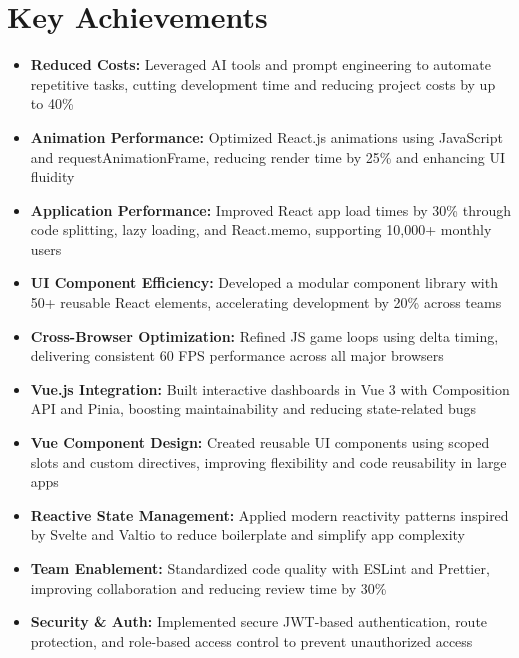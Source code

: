 \documentclass[11pt]{article}
\begin{document}
\section{Key Achievements}
\begin{itemize}
\item \textbf{Reduced Costs:} Leveraged AI tools and prompt engineering to automate repetitive tasks, cutting development time and reducing project costs by up to 40\%
\item \textbf{Animation Performance:} Optimized React.js animations using JavaScript and requestAnimationFrame, reducing render time by 25\% and enhancing UI fluidity
\item \textbf{Application Performance:} Improved React app load times by 30\% through code splitting, lazy loading, and React.memo, supporting 10,000+ monthly users
\item \textbf{UI Component Efficiency:} Developed a modular component library with 50+ reusable React elements, accelerating development by 20\% across teams
\item \textbf{Cross-Browser Optimization:} Refined JS game loops using delta timing, delivering consistent 60 FPS performance across all major browsers
\item \textbf{Vue.js Integration:} Built interactive dashboards in Vue 3 with Composition API and Pinia, boosting maintainability and reducing state-related bugs
\item \textbf{Vue Component Design:} Created reusable UI components using scoped slots and custom directives, improving flexibility and code reusability in large apps
\item \textbf{Reactive State Management:} Applied modern reactivity patterns inspired by Svelte and Valtio to reduce boilerplate and simplify app complexity
\item \textbf{Team Enablement:} Standardized code quality with ESLint and Prettier, improving collaboration and reducing review time by 30\%
\item \textbf{Security \& Auth:} Implemented secure JWT-based authentication, route protection, and role-based access control to prevent unauthorized access
\end{itemize}

\end{document}

